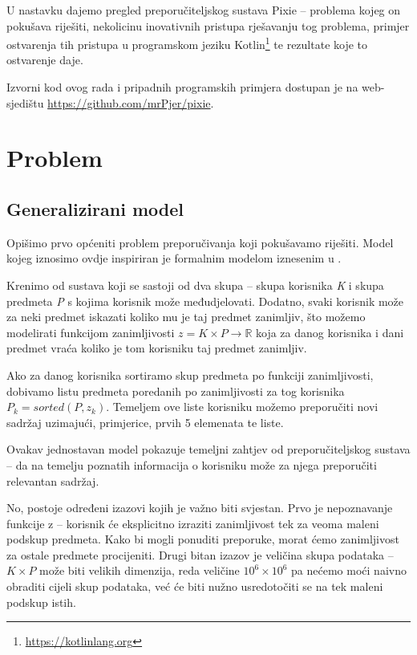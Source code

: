 \documentclass[times, utf8, seminar]{fer}
\begin{document}
U nastavku dajemo pregled preporučiteljskog sustava Pixie -- problema kojeg on pokušava riješiti, nekolicinu inovativnih pristupa rješavanju tog problema, primjer ostvarenja tih pristupa u programskom jeziku Kotlin\footnote{\url{https://kotlinlang.org}} te rezultate koje to ostvarenje daje.

Izvorni kod ovog rada i pripadnih programskih primjera dostupan je na web-sjedištu \url{https://github.com/mrPjer/pixie}.

\chapter{Problem}

\section{Generalizirani model}
Opišimo prvo općeniti problem preporučivanja koji pokušavamo riješiti. Model kojeg iznosimo ovdje inspiriran je formalnim modelom iznesenim u \cite{avsp-recommender}.

Krenimo od sustava koji se sastoji od dva skupa -- skupa korisnika \textit{K} i skupa predmeta \textit{P} s kojima korisnik može međudjelovati. Dodatno, svaki korisnik može za neki predmet iskazati koliko mu je taj predmet zanimljiv, što možemo modelirati funkcijom zanimljivosti $z = K \times P \to \mathbb{R}$ koja za danog korisnika i dani predmet vraća koliko je tom korisniku taj predmet zanimljiv.

Ako za danog korisnika sortiramo skup predmeta po funkciji zanimljivosti, dobivamo listu predmeta poredanih po zanimljivosti za tog korisnika $P_k = sorted(P, z_k)$. Temeljem ove liste korisniku možemo preporučiti novi sadržaj uzimajući, primjerice, prvih 5 elemenata te liste.

Ovakav jednostavan model pokazuje temeljni zahtjev od preporučiteljskog sustava -- da na temelju poznatih informacija o korisniku može za njega preporučiti relevantan sadržaj. 

No, postoje određeni izazovi kojih je važno biti svjestan. Prvo je nepoznavanje funkcije z -- korisnik će eksplicitno izraziti zanimljivost tek za veoma maleni podskup predmeta. Kako bi mogli ponuditi preporuke, morat ćemo zanimljivost za ostale predmete procijeniti. Drugi bitan izazov je veličina skupa podataka -- $K \times P$ može biti velikih dimenzija, reda veličine $10^6 \times 10^6$ pa nećemo moći naivno obraditi cijeli skup podataka, već će biti nužno usredotočiti se na tek maleni podskup istih.
\end{document}
